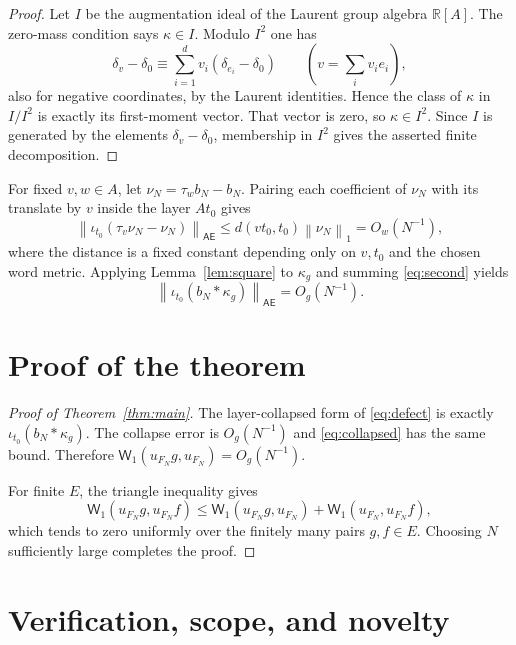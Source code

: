 \documentclass[11pt]{article}
\newcommand{\R}{\mathbb R}
\newcommand{\AEn}{\mathsf{AE}}
\newcommand{\W}{\mathsf W_1}
\newcommand{\norm}[1]{\left\lVert#1\right\rVert}
\begin{document}
\begin{proof}
Let $I$ be the augmentation ideal of the Laurent group algebra $\R[A]$.
The zero-mass condition says $\kappa\in I$.  Modulo $I^2$ one has
\[
 \delta_v-\delta_0\equiv
 \sum_{i=1}^d v_i(\delta_{e_i}-\delta_0)
 \qquad(v=\textstyle\sum_i v_ie_i),
\]
also for negative coordinates, by the Laurent identities.  Hence the class
of $\kappa$ in $I/I^2$ is exactly its first-moment vector.  That vector is
zero, so $\kappa\in I^2$.  Since $I$ is generated by the elements
$\delta_v-\delta_0$, membership in $I^2$ gives the asserted finite
decomposition.
\end{proof}

For fixed $v,w\in A$, let $\nu_N=\tau_wb_N-b_N$.  Pairing each coefficient
of $\nu_N$ with its translate by $v$ inside the layer $At_0$ gives
\begin{equation}\label{eq:second}
 \norm{\iota_{t_0}(\tau_v\nu_N-\nu_N)}_{\AEn}
 \leq d(vt_0,t_0)\norm{\nu_N}_1
 =O_w(N^{-1}),
\end{equation}
where the distance is a fixed constant depending only on $v,t_0$ and the
chosen word metric.  Applying Lemma~\ref{lem:square} to $\kappa_g$ and
summing \eqref{eq:second} yields
\begin{equation}\label{eq:collapsed}
 \norm{\iota_{t_0}(b_N*\kappa_g)}_{\AEn}=O_g(N^{-1}).
\end{equation}

\section{Proof of the theorem}

\begin{proof}[Proof of Theorem~\ref{thm:main}]
The layer-collapsed form of \eqref{eq:defect} is exactly
$\iota_{t_0}(b_N*\kappa_g)$.  The collapse error is $O_g(N^{-1})$ and
\eqref{eq:collapsed} has the same bound.  Therefore
$\W(u_{F_N}g,u_{F_N})=O_g(N^{-1})$.

For finite $E$, the triangle inequality gives
\[
 \W(u_{F_N}g,u_{F_N}f)
 \leq \W(u_{F_N}g,u_{F_N})+
       \W(u_{F_N},u_{F_N}f),
\]
which tends to zero uniformly over the finitely many pairs $g,f\in E$.
Choosing $N$ sufficiently large completes the proof.
\end{proof}

\section{Verification, scope, and novelty}
\end{document}
